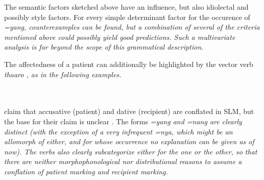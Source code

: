 The semantic factors sketched above have an influence, but also idiolectal and possibly style factors. For every simple determinant factor for the occurence of \em =yang\em, counterexamples can be found, but a combination of several of the criteria mentioned above could possibly yield good predictions. Such a multivariate analysis is far beyond the scope of this grammatical description.

%
%
%
%
%
%


The affectedness of a patient can additionally be highlighted by the vector verb \em thaaro \em {}, as in the following examples.

 \\
 \\
\citet{SmithEtAl2004} claim that accusative (patient) and dative (recipient) are conflated in SLM, but the base for their claim is unclear \citep{Ansaldo2005ms}. The forms \em =yang \em and \em =nang \em are clearly distinct (with the exception of a very infrequent \em =nya\em, which might be an allomorph of either, and for whose occurrence no explanation can be given as of now). The verbs also clearly subcategorize either for the one or the other, so that there are neither morphophonological nor distributional reasons to assume a conflation of patient marking and recipient marking.

